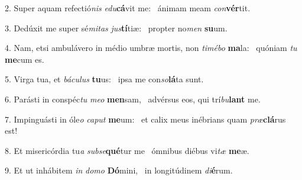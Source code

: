 2. Super aquam refectió\textit{nis} \textit{e}\textit{du}\textbf{cá}vit me: \ast\  ánimam meam \textit{con}\textbf{vér}tit.\

3. Dedúxit me super sé\textit{mi}\textit{tas} \textit{jus}\textbf{tí}tiæ: \ast\  propter no\textit{men} \textbf{su}um.\

4. Nam, etsi ambulávero in médio umbræ mortis, non \textit{ti}\textit{mé}\textit{bo} \textbf{ma}la: \ast\  quóniam \textit{tu} \textbf{me}cum es.\

5. Virga tua, et \textit{bá}\textit{cu}\textit{lus} \textbf{tu}us: \ast\  ipsa me con\textit{so}\textbf{lá}ta sunt.\

6. Parásti in conspéc\textit{tu} \textit{me}\textit{o} \textbf{men}sam, \ast\  advérsus eos, qui trí\textit{bu}\textbf{lant} me.\

7. Impinguásti in óle\textit{o} \textit{ca}\textit{put} \textbf{me}um: \ast\  et calix meus inébrians quam \textit{præ}\textbf{clá}rus est!\

8. Et misericórdia tu\textit{a} \textit{sub}\textit{se}\textbf{qué}tur me \ast\  ómnibus diébus vi\textit{tæ} \textbf{me}æ.\

9. Et ut inhábitem \textit{in} \textit{do}\textit{mo} \textbf{Dó}mini, \ast\  in longitúdinem \textit{di}\textbf{é}rum.\


